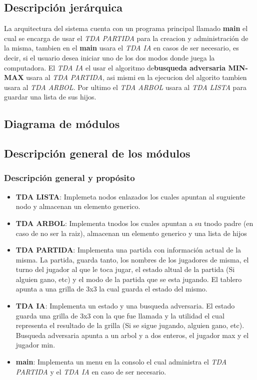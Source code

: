 \documentclass[12pt,twocolum,a4paper]{article}
\begin{document}
\subsection{Descripci\'on jer\'arquica}
\begin{frame}
    La arquitectura del sistema cuenta con un programa principal llamado {\bf main} el cual se encarga de usar el {\itshape TDA PARTIDA} para la creacion y administraci\'on de la misma, tambien en el {\bf main} usara el {\itshape TDA IA} en casos de ser necesario, es decir, si el usuario desea iniciar uno de los dos modos donde juega la computadora.
    \newline
    El {\itshape TDA IA} el usar el algoritmo de{\bf busqueda adversaria MIN-MAX} usara al {\itshape TDA PARTIDA}, asi mismi en la ejecucion del algorito tambien usara al {\itshape TDA ARBOL}.
    \newline
    Por ultimo el {\itshape TDA ARBOL} usara al {\itshape TDA LISTA} para guardar una lista de sus hijos.
\end{frame}

\subsection{Diagrama de m\'odulos}

\subsection{Descripci\'on general de los m\'odulos}
\subsubsection{Descripci\'on general y prop\'osito}
\begin{itemize}
    \item {\bf TDA LISTA}: Implemeta nodos enlazados los cuales apuntan al suguiente nodo y almacenan un elemento generico.
    \item {\bf TDA ARBOL}: Implementa tnodos los cuales apuntan a su tnodo padre (en caso de no ser la raiz), almacenan un elemento generico y una lista de hijos
    \item {\bf TDA PARTIDA}: Implementa una partida con informaci\'on actual de la misma. La partida, guarda tanto, los nombres de los jugadores de misma, el turno del jugador al que le toca jugar, el estado altual de la partida (Si alguien gano, etc) y el modo de la partida que se esta jugando. El tablero apunta a una grilla de 3x3 la cual guarda el estado del mismo. 
    \item {\bf TDA IA}: Implementa un estado y una busqueda adversaria. El estado guarda una grilla de 3x3 con la que fue llamada y la utilidad el cual representa el resultado de la grilla (Si se sigue jugando, alguien gano, etc). Busqueda adversaria apunta a un arbol y a dos enteros, el jugador max y el jugador min.
    \item {\bf main}: Implementa un menu en la consolo el cual administra el {\itshape TDA PARTIDA} y el {\itshape TDA IA} en caso de ser necesario.
\end{itemize}
\end{document}
